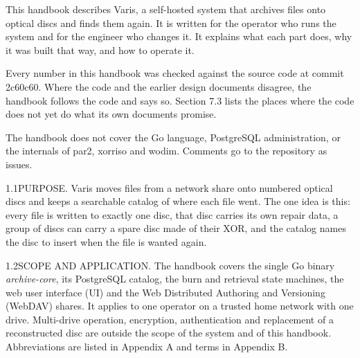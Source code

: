 \documentclass[handbook]{nasa-handbook}
\begin{document}
\nhcover

\begin{nhhistory}
\end{nhhistory}

\nhcontents

This handbook describes Varis, a self-hosted system that archives files onto optical discs and finds them again. It is written for the operator who runs the system and for the engineer who changes it. It explains what each part does, why it was built that way, and how to operate it.

Every number in this handbook was checked against the source code at commit 2c60c60. Where the code and the earlier design documents disagree, the handbook follows the code and says so. Section 7.3 lists the places where the code does not yet do what its own documents promise.

The handbook does not cover the Go language, PostgreSQL administration, or the internals of par2, xorriso and wodim. Comments go to the repository as issues.


\begin{nhpara}{1.1}{PURPOSE.}
Varis moves files from a network share onto numbered optical discs and keeps a searchable catalog of where each file went. The one idea is this: every file is written to exactly one disc, that disc carries its own repair data, a group of discs can carry a spare disc made of their XOR, and the catalog names the disc to insert when the file is wanted again.
\end{nhpara}

\begin{nhpara}{1.2}{SCOPE AND APPLICATION.}
The handbook covers the single Go binary \textit{archive-core}, its PostgreSQL catalog, the burn and retrieval state machines, the web user interface (UI) and the Web Distributed Authoring and Versioning (WebDAV) shares. It applies to one operator on a trusted home network with one drive. Multi-drive operation, encryption, authentication and replacement of a reconstructed disc are outside the scope of the system and of this handbook. Abbreviations are listed in Appendix A and terms in Appendix B.
\end{nhpara}
\end{document}
